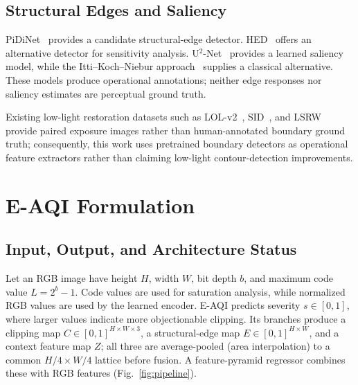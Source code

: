 \documentclass[5p,times,twocolumn]{elsarticle}
\begin{document}
\subsection{Structural Edges and Saliency}

PiDiNet~\cite{su2021pidinet} provides a candidate structural-edge detector.
HED~\cite{xie2015hed} offers an alternative detector for sensitivity analysis.
U$^2$-Net~\cite{qin2020u2net} provides a learned saliency model, while the
Itti--Koch--Niebur approach~\cite{itti1998saliency} supplies a classical
alternative. These models produce operational annotations; neither edge
responses nor saliency estimates are perceptual ground truth.

Existing low-light restoration datasets such as
LOL-v2~\cite{yang2020lol}, SID~\cite{chen2018sid}, and
LSRW~\cite{hai2023r2rnet} provide paired exposure images rather than
human-annotated boundary ground truth; consequently, this work uses
pretrained boundary detectors as operational feature extractors rather than
claiming low-light contour-detection improvements.

\section{E-AQI Formulation}
\label{sec:formulation}

\subsection{Input, Output, and Architecture Status}
\label{sec:arch}

Let an RGB image have height $H$, width $W$, bit depth $b$, and maximum code
value $L = 2^{b} - 1$. Code values are used for saturation analysis, while
normalized RGB values are used by the learned encoder. E-AQI predicts severity
$s \in [0, 1]$, where larger values indicate more objectionable clipping. Its
branches produce a clipping map $C \in [0,1]^{H \times W \times 3}$, a
structural-edge map $E \in [0,1]^{H \times W}$, and a context feature map
$Z$; all three are average-pooled (area interpolation) to a common
$H/4 \times W/4$ lattice before fusion. A feature-pyramid regressor combines
these with RGB features (Fig.~\ref{fig:pipeline}).
\end{document}

